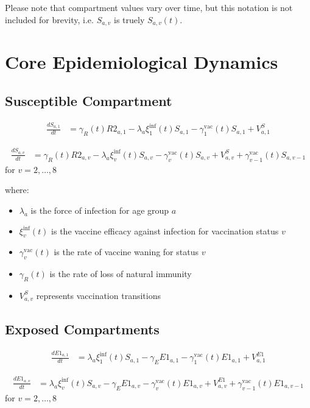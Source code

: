 \documentclass[12pt]{article}
\begin{document}
Please note that compartment values vary over time, but this notation is not included for brevity, i.e. $S_{a,v}$ is truely  $S_{a,v}(t)$.

\section{Core Epidemiological Dynamics}

\subsection{Susceptible Compartment}

\begin{align*}
\frac{dS_{a,1}}{dt} &= \gamma_R(t) R2_{a,1} - \lambda_a \xi^{\text{inf}}_1(t) S_{a,1} - \gamma^{\text{vac}}_1(t) S_{a,1} + V^S_{a,1}
\end{align*}

\begin{align*}
\frac{dS_{a,v}}{dt} &= \gamma_R(t) R2_{a,v} - \lambda_a \xi^{\text{inf}}_v(t) S_{a,v} - \gamma^{\text{vac}}_v(t) S_{a,v} + V^S_{a,v} + \gamma^{\text{vac}}_{v-1}(t) S_{a,v-1}
\end{align*}
for $v = 2, \ldots, 8$

where:
\begin{itemize}
    \item $\lambda_a$ is the force of infection for age group $a$
    \item $\xi^{\text{inf}}_v(t)$ is the vaccine efficacy against infection for vaccination status $v$
    \item $\gamma^{\text{vac}}_v(t)$ is the rate of vaccine waning for status $v$
    \item $\gamma_R(t)$ is the rate of loss of natural immunity
    \item $V^S_{a,v}$ represents vaccination transitions
\end{itemize}

\subsection{Exposed Compartments}

\begin{align*}
\frac{dE1_{a,1}}{dt} &= \lambda_a \xi^{\text{inf}}_1(t) S_{a,1} - \gamma_E E1_{a,1} - \gamma^{\text{vac}}_1(t) E1_{a,1} + V^{E1}_{a,1}
\end{align*}

\begin{align*}
\frac{dE1_{a,v}}{dt} &= \lambda_a \xi^{\text{inf}}_v(t) S_{a,v} - \gamma_E E1_{a,v} - \gamma^{\text{vac}}_v(t) E1_{a,v} + V^{E1}_{a,v} + \gamma^{\text{vac}}_{v-1}(t) E1_{a,v-1}
\end{align*}
for $v = 2, \ldots, 8$
\end{document}
